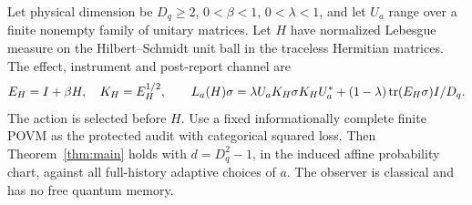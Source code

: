 \begin{theorem}\label{thm:quantum}
Let physical dimension be $D_q\ge2$, $0<\beta<1$, $0<\lambda<1$, and let $U_a$ range over a finite nonempty family of unitary matrices. Let $H$ have normalized Lebesgue measure on the Hilbert--Schmidt unit ball in the traceless Hermitian matrices. The effect, instrument and post-report channel are
\[
 E_H=I+\beta H,\quad K_H=E_H^{1/2},\qquad
 L_a(H)\sigma=\lambda U_aK_H\sigma K_HU_a^*
       +(1-\lambda)\operatorname{tr}(E_H\sigma)I/D_q.
\]
The action is selected before $H$. Use a fixed informationally complete finite POVM as the protected audit with categorical squared loss. Then Theorem~\ref{thm:main} holds with $d=D_q^2-1$, in the induced affine probability chart, against all full-history adaptive choices of $a$. The observer is classical and has no free quantum memory.
\end{theorem}
